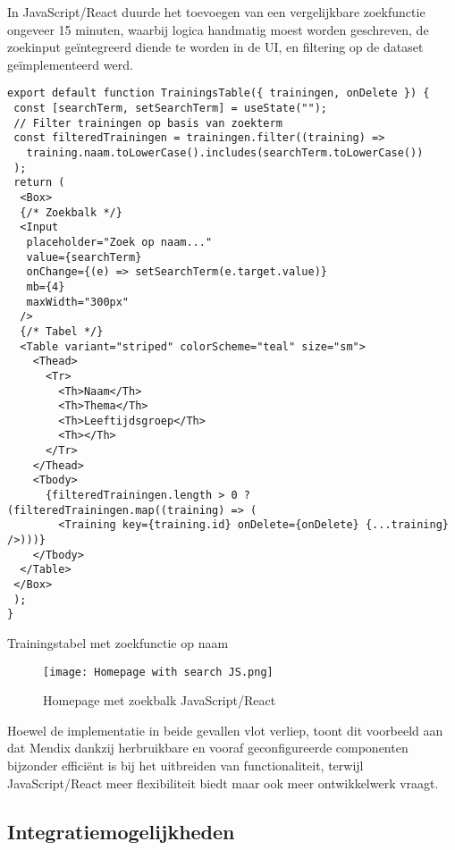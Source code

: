 In JavaScript/React duurde het toevoegen van een vergelijkbare zoekfunctie ongeveer 15 minuten, waarbij logica handmatig moest worden geschreven, de zoekinput geïntegreerd diende te worden in de UI, en filtering op de dataset geïmplementeerd werd.

\begin{listing}[H]
    \begin{verbatim}
export default function TrainingsTable({ trainingen, onDelete }) {
 const [searchTerm, setSearchTerm] = useState("");
 // Filter trainingen op basis van zoekterm
 const filteredTrainingen = trainingen.filter((training) =>
   training.naam.toLowerCase().includes(searchTerm.toLowerCase())
 );
 return (
  <Box>
  {/* Zoekbalk */}
  <Input
   placeholder="Zoek op naam..."
   value={searchTerm}
   onChange={(e) => setSearchTerm(e.target.value)}
   mb={4}
   maxWidth="300px"
  />
  {/* Tabel */}
  <Table variant="striped" colorScheme="teal" size="sm">
    <Thead>
      <Tr>
        <Th>Naam</Th>
        <Th>Thema</Th>
        <Th>Leeftijdsgroep</Th>
        <Th></Th>
      </Tr>
    </Thead>
    <Tbody>
      {filteredTrainingen.length > 0 ? (filteredTrainingen.map((training) => (
        <Training key={training.id} onDelete={onDelete} {...training} />)))}
    </Tbody>
  </Table>
 </Box>
 );
}   
    \end{verbatim}
    \captionsetup{justification=centering}
    \caption{Trainingstabel met zoekfunctie op naam}
    \label{lst:pipeline-clone}
\end{listing}

\begin{figure}[H]
    \centering
    \captionsetup{justification=centering}
    \texttt{[image: Homepage with search JS.png]}
    \caption[\centering Homepage with search bar JavaScript/React]{\label{fig:homepage-with-search-JS} Homepage met zoekbalk JavaScript/React}
\end{figure}


 Hoewel de implementatie in beide gevallen vlot verliep, toont dit voorbeeld aan dat Mendix dankzij herbruikbare en vooraf geconfigureerde componenten bijzonder efficiënt is bij het uitbreiden van functionaliteit, terwijl JavaScript/React meer flexibiliteit biedt maar ook meer ontwikkelwerk vraagt.


\subsection{Integratiemogelijkheden}

